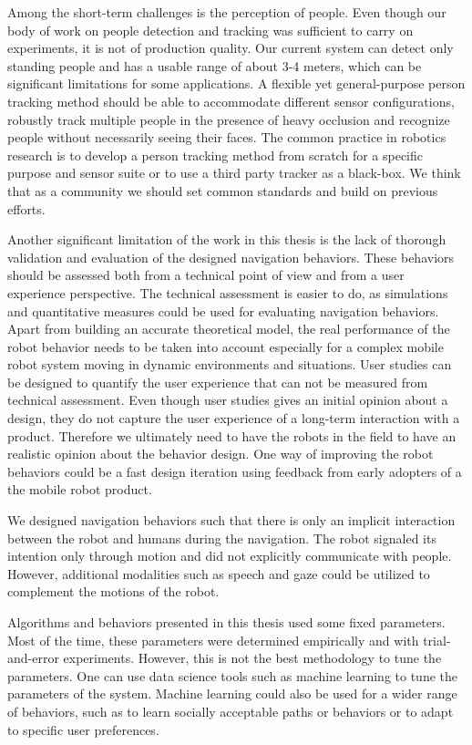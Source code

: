 Among the short-term challenges is the perception of people. Even though our body of work on people detection and tracking was sufficient to carry on experiments, it is not of production quality. Our current system can detect only standing people and has a usable range of about 3-4 meters, which can be significant limitations for some applications. A flexible yet general-purpose person tracking method should be able to accommodate different sensor configurations, robustly track multiple people in the presence of heavy occlusion and recognize people without necessarily seeing their faces. The common practice in robotics research is to develop a person tracking method from scratch for a specific purpose and sensor suite or to use a third party tracker as a black-box. We think that as a community we should set common standards and build on previous efforts.

Another significant limitation of the work in this thesis is the lack of thorough validation and evaluation of the designed navigation behaviors. These behaviors should be assessed both from a technical point of view and from a user experience perspective. The technical assessment is easier to do, as simulations and quantitative measures could be used for evaluating navigation behaviors. Apart from building an accurate theoretical model, the real performance of the robot behavior needs to be taken into account especially for a complex mobile robot system moving in dynamic environments and situations. User studies can be designed to quantify the user experience that can not be measured from technical assessment. Even though user studies gives an initial opinion about a design, they do not capture the user experience of a long-term interaction with a product. Therefore we ultimately need to have the robots in the field to have an realistic opinion about the behavior design. One way of improving the robot behaviors could be a fast design iteration using feedback from early adopters of a the mobile robot product.

We designed navigation behaviors such that there is only an implicit interaction between the robot and humans during the navigation. The robot signaled its intention only through motion and did not explicitly communicate with people. However, additional modalities such as speech and gaze could be utilized to complement the motions of the robot. 

Algorithms and behaviors presented in this thesis used some fixed parameters. Most of the time, these parameters were determined empirically and with trial-and-error experiments. However, this is not the best methodology to tune the parameters. One can use data science tools such as machine learning to tune the parameters of the system. Machine learning could also be used for a wider range of behaviors, such as to learn socially acceptable paths or behaviors or to adapt to specific user preferences.


